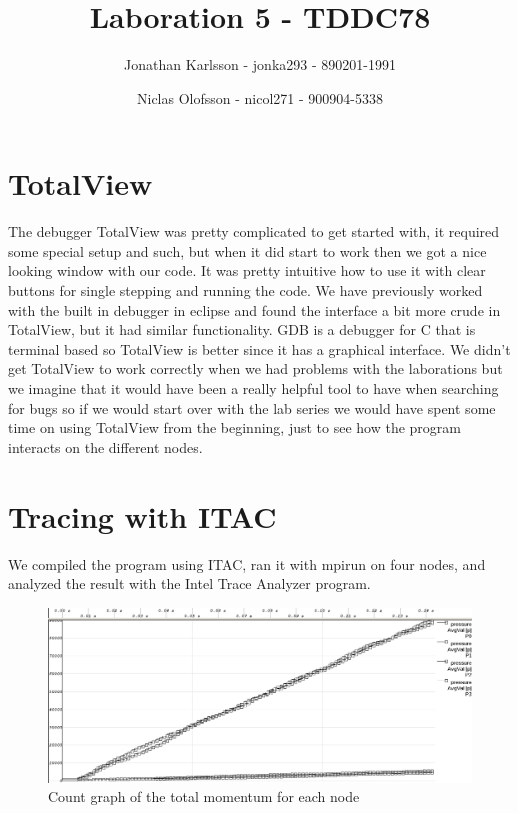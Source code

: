 \documentclass[a4paper]{article}
\author{Jonathan Karlsson - jonka293 - 890201-1991 \and Niclas Olofsson - nicol271 - 900904-5338}
\title{Laboration 5 - TDDC78}
\begin{document}
\maketitle

\section{TotalView}
The debugger TotalView was pretty complicated to get started with, it required some special setup and such, but when it did start to work then we got a nice looking window with our code. It was pretty intuitive how to use it with clear buttons for single stepping and running the code. We have previously worked with the built in debugger in eclipse and found the interface a bit more crude in TotalView, but it had similar functionality. GDB is a debugger for C that is terminal based so TotalView is better since it has a graphical interface. We didn\rq{}t get TotalView to work correctly when we had problems with the laborations but we imagine that it would have been a really helpful tool to have when searching for bugs so if we would start over with the lab series we would have spent some time on using TotalView from the beginning, just to see how the program interacts on the different nodes.

\section{Tracing with ITAC}

We compiled the program using ITAC, ran it with mpirun on four nodes,
and analyzed the result with the Intel Trace Analyzer program.


\begin{figure}
  \centering
  \includegraphics{count.png}
  \caption{Count graph of the total momentum for each node}
  \label{fig1}
\end{figure}
\end{document}
